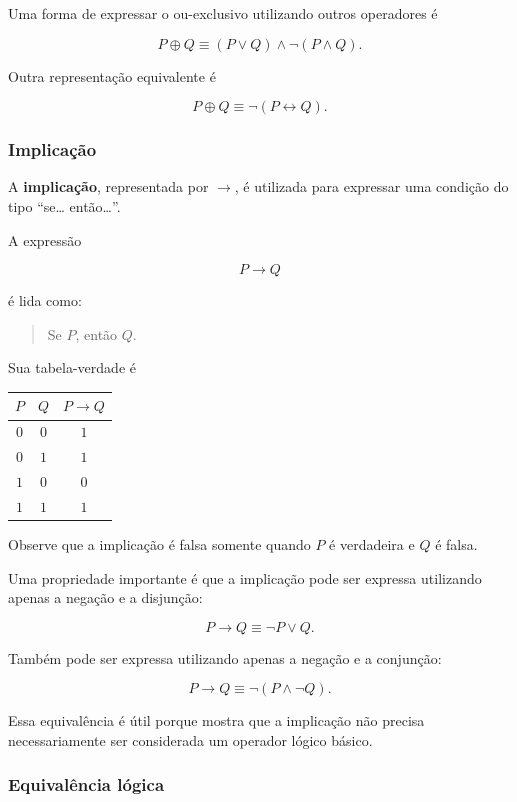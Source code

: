 \documentclass[
  brazilian,
  letterpaper,
]{book}
\theoremstyle{plain}
\theoremstyle{definition}
\theoremstyle{remark}
\begin{document}
Uma forma de expressar o ou-exclusivo utilizando outros operadores é

\[
P\oplus Q
\equiv
(P\vee Q)\wedge\neg(P\wedge Q).
\]

Outra representação equivalente é

\[
P\oplus Q
\equiv
\neg(P\leftrightarrow Q).
\]

\subsubsection{Implicação}\label{implicauxe7uxe3o}

A \textbf{implicação}, representada por \(\rightarrow\), é utilizada
para expressar uma condição do tipo ``se\ldots{} então\ldots{}''.

A expressão

\[
P\rightarrow Q
\]

é lida como:

\begin{quote}
Se \(P\), então \(Q\).
\end{quote}

Sua tabela-verdade é

\begin{longtable*}[]{|c|c|c|}
\toprule\noalign{}
\(P\) & \(Q\) & \(P\rightarrow Q\) \\
\midrule\noalign{}
\endhead
\bottomrule\noalign{}
\endlastfoot
\(0\) & \(0\) & \(1\) \\
\midrule
\(0\) & \(1\) & \(1\) \\
\midrule
\(1\) & \(0\) & \(0\) \\
\midrule
\(1\) & \(1\) & \(1\) \\
\end{longtable*}

Observe que a implicação é falsa somente quando \(P\) é verdadeira e
\(Q\) é falsa.

Uma propriedade importante é que a implicação pode ser expressa
utilizando apenas a negação e a disjunção:

\[
P\rightarrow Q
\equiv
\neg P\vee Q.
\]

Também pode ser expressa utilizando apenas a negação e a conjunção:

\[
P\rightarrow Q
\equiv
\neg(P\wedge\neg Q).
\]

Essa equivalência é útil porque mostra que a implicação não precisa
necessariamente ser considerada um operador lógico básico.

\subsubsection{Equivalência lógica}\label{equivaluxeancia-luxf3gica}
\end{document}
